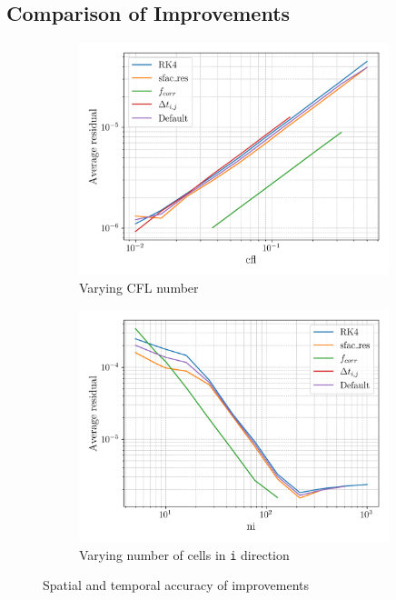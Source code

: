 \documentclass{article}
\begin{document}
\subsection{Comparison of Improvements}

\begin{figure}[H]
    \centering
    \begin{subfigure}{0.49\textwidth}
        \centering
        \includegraphics[width=0.99\textwidth]{figures/improvements_cfl_residual.png}
        \caption{Varying CFL number}
        \label{fig:improvements_cfl_residual}
    \end{subfigure}
    \begin{subfigure}{0.49\textwidth}
        \centering
        \includegraphics[width=0.99\textwidth]{figures/improvements_ni_residual.png}
        \caption{Varying number of cells in \texttt{i} direction}
        \label{fig:improvements_ni_residual}
    \end{subfigure}
    \caption{Spatial and temporal accuracy of improvements}
\end{figure}
\end{document}
